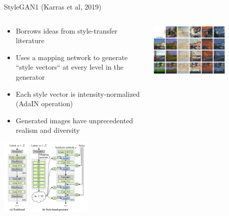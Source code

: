 \documentclass[8pt,xcolor=table,aspectratio=169]{beamer}
\begin{document}
\begin{frame}{StyleGAN1 (Karras et al, 2019)}

\begin{columns}
\begin{column}{0.5\textwidth}

\begin{itemize}
 \item Borrows ideas from style-transfer literature 
 
 \vspace{0.5em} 
 
 \item Uses a mapping network to generate ``style vectors`` at every level in the generator

 \vspace{0.5em} 
 
 \item Each style vector is intensity-normalized (AdaIN operation)
 
 \vspace{0.5em}
 
 \item Generated images have unprecedented realism and diversity

\end{itemize}

\begin{center}
\includegraphics[width=0.6\textwidth]{qvLyFbU.png}
\end{center}

\end{column}
\begin{column}{0.5\textwidth}
\centering
\includegraphics[width=0.7\textwidth]{style}


\end{column}
\end{columns}
\end{frame}
\end{document}
